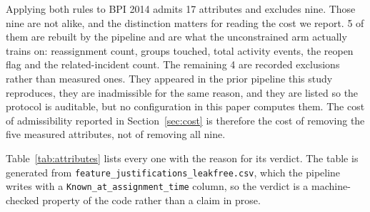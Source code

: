 Applying both rules to BPI 2014 admits \num{17} attributes and excludes nine.
Those nine are not alike, and the distinction matters for reading the cost we report.
\num{5} of them are rebuilt by the pipeline and are what the unconstrained arm actually
trains on: reassignment count, groups touched, total activity events, the reopen flag and
the related-incident count. The remaining \num{4} are recorded exclusions rather than
measured ones. They appeared in the prior pipeline this study reproduces, they are
inadmissible for the same reason, and they are listed so the protocol is auditable, but no
configuration in this paper computes them. The cost of admissibility reported in
Section~\ref{sec:cost} is therefore the cost of removing the five measured attributes, not
of removing all nine.

Table~\ref{tab:attributes} lists every one with the reason for its verdict. The table is
generated from \texttt{feature\_\allowbreak justifications\_\allowbreak leakfree.csv}, which the pipeline writes with a
\texttt{Known\_\allowbreak at\_\allowbreak assignment\_\allowbreak time} column, so the verdict is a machine-checked property of
the code rather than a claim in prose.

